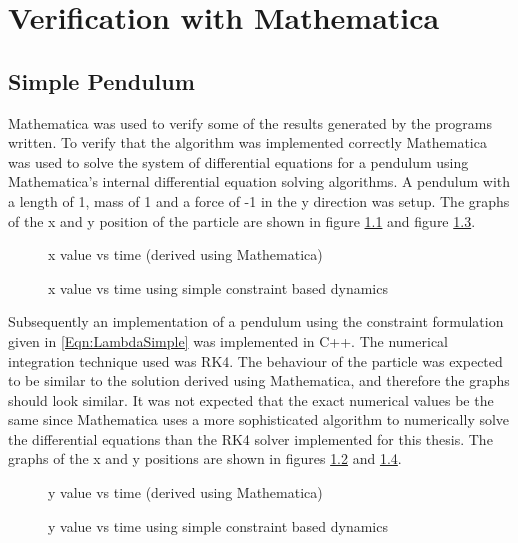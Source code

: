 \chapter{Verification with Mathematica}
\section{Simple Pendulum}
Mathematica was used to verify some of the results generated by the programs written.
To verify that the algorithm was implemented correctly Mathematica was used to
solve the system of differential equations for a pendulum using Mathematica's
internal differential equation solving algorithms. A pendulum with a length of
1, mass of 1 and a force of -1 in the y direction was setup. The 
graphs of the x and y position of the particle are shown in figure
\ref{Fig:x_single_pendulum} and figure \ref{Fig:y_single_pendulum}.

\begin{figure} 
	\begin{center}
	\end{center}
    \caption{x value vs time (derived using Mathematica)}
\label{Fig:x_single_pendulum}   
\end{figure}
\begin{figure}    
	\begin{center}
	\end{center}
    \caption{x value vs time using simple constraint based dynamics}
	\label{Fig:x_single_pendulum_simple_constr}
\end{figure}  

Subsequently an implementation of a pendulum using the constraint formulation
given in \ref{Eqn:LambdaSimple} was implemented in C++. The numerical
integration technique used was RK4. The behaviour of the particle was expected
to be similar to the solution derived using Mathematica, and therefore the
graphs should look similar. It was not expected that the exact numerical values
be the same since Mathematica uses a more sophisticated algorithm to numerically
solve the differential equations than the RK4 solver implemented for this
thesis.  The graphs of the x and y positions are shown in figures
\ref{Fig:x_single_pendulum_simple_constr} and
\ref{Fig:y_single_pendulum_simple_constr}.

\begin{figure}    
	\begin{center}
	\end{center}
    \caption{y value vs time (derived using Mathematica)}
	\label{Fig:y_single_pendulum}
\end{figure}
\begin{figure}    
	\begin{center}
	\end{center}
    \caption{y value vs time using simple constraint based dynamics}
	\label{Fig:y_single_pendulum_simple_constr}
\end{figure} 

